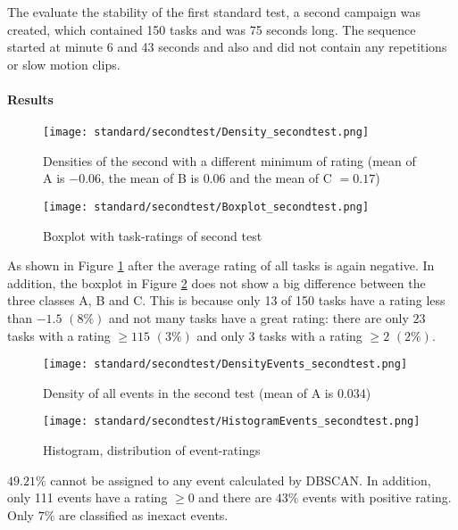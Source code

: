 The evaluate the stability of the first standard test, a second campaign was created, which contained 150 tasks and was 75 seconds long.
The sequence started at minute 6 and 43 seconds and also and did not contain any repetitions or slow motion clips.

\paragraph{Results}

\begin{figure}[H]
    \centering
    \texttt{[image: standard/secondtest/Density\_secondtest.png]}
    \caption{Densities of the second with a different minimum of rating (mean of A is $-0.06$, the mean of B is $0.06$ and the mean of C $ = 0.17$)}
    \label{img:Density:secontest}
\end{figure}

\begin{figure}[H]
    \centering
    \texttt{[image: standard/secondtest/Boxplot\_secondtest.png]}
    \caption{Boxplot with task-ratings of second test}
    \label{img:Boxplot_secondtest}
\end{figure}

As shown in Figure \ref{img:Density:secontest} after the average rating of all tasks is again negative. In addition, the boxplot in Figure \ref{img:Boxplot_secondtest} does not show a big difference between the three classes A, B and C. This is because only 13 of 150 tasks have a rating less than $-1.5$ $(8\%)$ and not many tasks have a great rating: there are only $23$ tasks with a rating $\ge 1 15$ $(3\%)$ and only $3$ tasks with a rating $\ge 2$ $(2\%)$.

\begin{figure}[H]
    \centering
    \texttt{[image: standard/secondtest/DensityEvents\_secondtest.png]}
    \caption{Density of all events in the second test (mean of A is $0.034$)}
\end{figure}

\begin{figure}[H]
    \centering
    \texttt{[image: standard/secondtest/HistogramEvents\_secondtest.png]}
    \caption{Histogram, distribution of event-ratings}
\end{figure}

$49.21\%$ cannot be assigned to any event calculated by DBSCAN. In addition, only 111 events have a rating $\ge 0$ and there are $43\%$ events with positive rating. Only $7\%$ are classified as inexact events.
\newline

